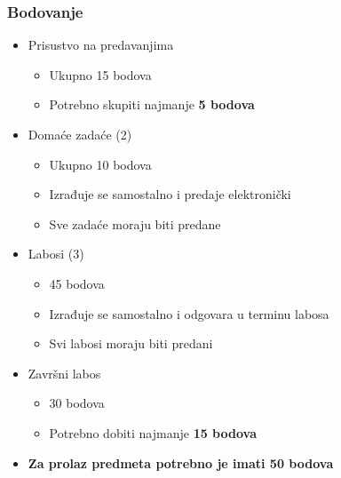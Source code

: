 \documentclass[t]{beamer}
\begin{document}
\begin{frame}
	\frametitle{Bodovanje}
	\begin{itemize}
		\item Prisustvo na predavanjima
		\begin{itemize}
			\item Ukupno 15 bodova 
			\item Potrebno skupiti najmanje \textbf{5 bodova}
		\end{itemize}
		\item Domaće zadaće (2)
		\begin{itemize}
			\item Ukupno 10 bodova
			\item Izrađuje se samostalno i predaje elektronički
			\item Sve zadaće moraju biti predane
		\end{itemize}
		\item Labosi (3)
		\begin{itemize}
			\item 45 bodova
			\item Izrađuje se samostalno i odgovara u terminu labosa
			\item Svi labosi moraju biti predani
		\end{itemize}
		\item Završni labos
		\begin{itemize}
			\item 30 bodova
			\item Potrebno dobiti najmanje \textbf{15 bodova}
		\end{itemize}
		\item \textbf{Za prolaz predmeta potrebno je imati 50 bodova}
	\end{itemize}
\end{frame}
\end{document}
